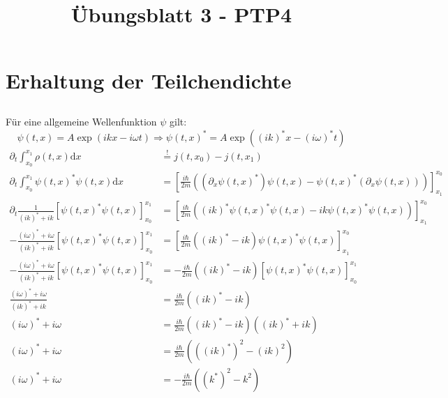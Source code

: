 \documentclass[a4paper,11pt]{article}
\title{Übungsblatt 3 - PTP4}
\author{}
\date{}
\begin{document}
\maketitle

\section{Erhaltung der Teilchendichte}

\subsection{}
Für eine allgemeine Wellenfunktion $\psi$ gilt:
\begin{equation}
        \psi(t, x) = A\exp(ikx -i\omega t) \Rightarrow \psi(t, x)^* = A\exp((ik)^*x - (i\omega)^*t)
\end{equation}
\begin{equation}
        \begin{aligned}
                \partial_t \int_{x_0}^{x_1} \rho(t, x)\text{d}x &\overset{!}{=} j(t, x_0) - j(t, x_1) \\
                \partial_t \int_{x_0}^{x_1} \psi(t, x)^*\psi(t, x)\text{d}x &= \left\lbrack\frac{i\hbar}{2m}\left(\left(\partial_x \psi(t, x)^*\right)\psi(t, x) - \psi(t, x)^*\left(\partial_x\psi(t, x)\right)\right)\right\rbrack_{x_1}^{x_0} \\
                \partial_t \frac{1}{(ik)^* + ik} [\psi(t, x)^*\psi(t, x)]_{x_0}^{x_1} &= \left\lbrack\frac{i\hbar}{2m}\left((ik)^*\psi(t, x)^*\psi(t, x) - ik\psi(t, x)^*\psi(t, x)\right)\right\rbrack_{x_1}^{x_0} \\
                -\frac{(i\omega)^* + i\omega}{(ik)^* + ik} [\psi(t, x)^*\psi(t, x)]_{x_0}^{x_1} &= \left\lbrack\frac{i\hbar}{2m}((ik)^* - ik)\psi(t, x)^*\psi(t, x)\right\rbrack_{x_1}^{x_0} \\
                -\frac{(i\omega)^* + i\omega}{(ik)^* + ik} [\psi(t, x)^*\psi(t, x)]_{x_0}^{x_1} &= -\frac{i\hbar}{2m}((ik)^* - ik)[\psi(t, x)^*\psi(t, x)]_{x_0}^{x_1} \\
                \frac{(i\omega)^* + i\omega}{(ik)^* + ik} &= \frac{i\hbar}{2m}((ik)^* - ik) \\
                (i\omega)^* + i\omega &= \frac{i\hbar}{2m}((ik)^* - ik)((ik)^* + ik) \\
                (i\omega)^* + i\omega &= \frac{i\hbar}{2m}(((ik)^*)^2 - (ik)^2) \\
                (i\omega)^* + i\omega &= -\frac{i\hbar}{2m}((k^*)^2 - k^2) \\
        \end{aligned}
\end{equation}
\end{document}

